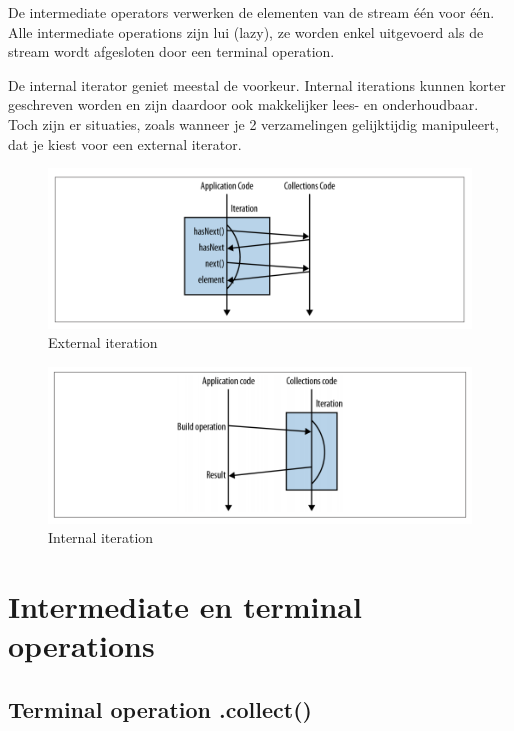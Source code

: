 \documentclass{tstextbook}
\begin{document}
De intermediate operators verwerken de elementen van de stream \'e\'en voor \'e\'en. Alle intermediate operations zijn lui (lazy), ze worden enkel uitgevoerd als de stream wordt afgesloten door een terminal operation.

De internal iterator geniet meestal de voorkeur. Internal iterations kunnen korter geschreven worden en zijn daardoor ook makkelijker lees- en onderhoudbaar. Toch zijn er situaties, zoals wanneer je 2 verzamelingen gelijktijdig manipuleert, dat je kiest voor een external iterator.

\begin{figure}[H]
  \includegraphics[width=\linewidth]{images/h6/external_iteration.png}
  \caption{External iteration}
  \label{fig:external_iteration}
\end{figure}

\begin{figure}[H]
  \includegraphics[width=\linewidth]{images/h6/internal_iteration.png}
  \caption{Internal iteration}
  \label{fig:internal_iteration}
\end{figure}

\section{Intermediate en terminal operations}

\subsection{Terminal operation .collect()}
\end{document}
